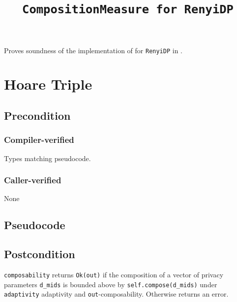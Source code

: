\documentclass{article}
\title{\texttt{CompositionMeasure for RenyiDP}}
\author{\MichaelShoemateAuthor}
\date{}
\begin{document}
\maketitle

\contrib
Proves soundness of the implementation of  
for \texttt{RenyiDP} in .

\section{Hoare Triple}
\subsection*{Precondition}
\subsubsection*{Compiler-verified}
Types matching pseudocode.


\subsubsection*{Caller-verified}
None

\subsection*{Pseudocode}


\subsection*{Postcondition}
\begin{theorem}
  \texttt{composability} returns \texttt{Ok(out)} if the composition of a vector of privacy parameters \texttt{d\_mids} 
  is bounded above by \texttt{self.compose(d\_mids)} under \texttt{adaptivity} adaptivity and \texttt{out}-composability.
  Otherwise returns an error.
\end{theorem}
\end{document}
